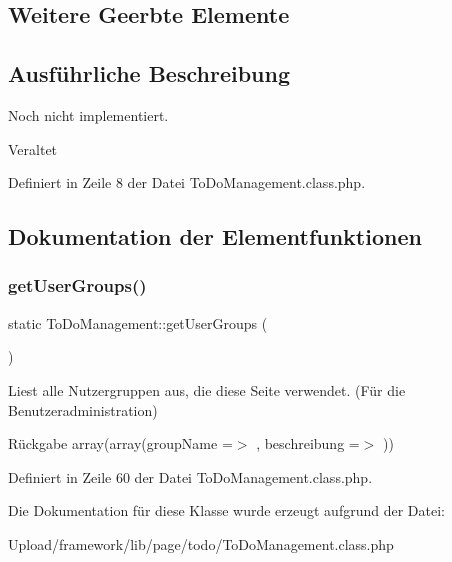 \subsection*{Weitere Geerbte Elemente}


\subsection{Ausführliche Beschreibung}
Noch nicht implementiert. \begin{DoxyRefDesc}{Veraltet}
\item[\mbox{\hyperlink{deprecated__deprecated000042}{Veraltet}}]\end{DoxyRefDesc}


Definiert in Zeile 8 der Datei To\+Do\+Management.\+class.\+php.



\subsection{Dokumentation der Elementfunktionen}
\mbox{\label{class_to_do_management_ac91d65d74167e85d0875e587eaff7c66}} 
\subsubsection{\texorpdfstring{get\+User\+Groups()}{getUserGroups()}}
{\footnotesize\ttfamily static To\+Do\+Management\+::get\+User\+Groups (\begin{DoxyParamCaption}{ }\end{DoxyParamCaption})\hspace{0.3cm}{\ttfamily [static]}}

Liest alle Nutzergruppen aus, die diese Seite verwendet. (Für die Benutzeradministration) \begin{DoxyReturn}{Rückgabe}
array(array(\textquotesingle{}group\+Name\textquotesingle{} =$>$ \textquotesingle{}\textquotesingle{}, \textquotesingle{}beschreibung\textquotesingle{} =$>$ \textquotesingle{}\textquotesingle{})) 
\end{DoxyReturn}


Definiert in Zeile 60 der Datei To\+Do\+Management.\+class.\+php.



Die Dokumentation für diese Klasse wurde erzeugt aufgrund der Datei\+:\begin{DoxyCompactItemize}
\item 
Upload/framework/lib/page/todo/To\+Do\+Management.\+class.\+php\end{DoxyCompactItemize}
